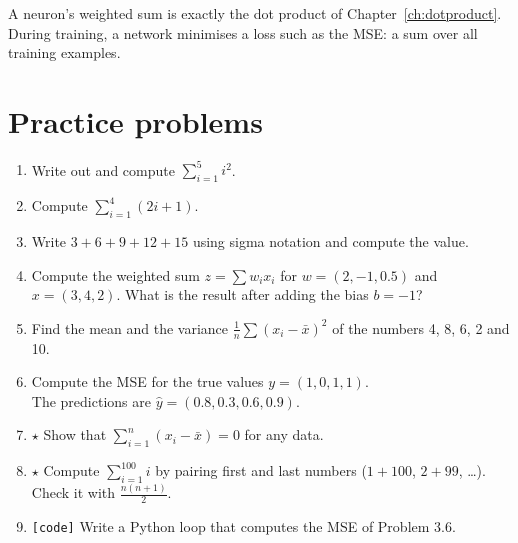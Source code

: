 \begin{center}

\label{fig:b1_9}
\end{center}

\begin{aibox}
A neuron's weighted sum is exactly the dot product of Chapter~\ref{ch:dotproduct}. During training, a network minimises a loss such as the MSE: a sum over all training examples.
\end{aibox}

\section*{Practice problems}
\begin{enumerate}[label=\textbf{\thechapter.\arabic*}]
  \item Write out and compute $\displaystyle\sum_{i=1}^5 i^2$.
  \item Compute $\displaystyle\sum_{i=1}^4(2i+1)$.
  \item Write $3+6+9+12+15$ using sigma notation and compute the value.
  \item Compute the weighted sum $z=\sum w_ix_i$ for $w=(2,-1,0.5)$ and $x=(3,4,2)$. What is the result after adding the bias $b=-1$?
  \item Find the mean and the variance $\frac1n\sum(x_i-\bar x)^2$ of the numbers 4, 8, 6, 2 and 10.
  \item Compute the MSE for the true values $y=(1,0,1,1)$.\\ The predictions are $\hat y=(0.8,0.3,0.6,0.9)$.
  \item $\star$ Show that $\displaystyle\sum_{i=1}^n(x_i-\bar x)=0$ for any data.
  \item $\star$ Compute $\displaystyle\sum_{i=1}^{100}i$ by pairing first and last numbers ($1+100$, $2+99$, \dots). Check it with $\frac{n(n+1)}{2}$.
  \item \texttt{[code]} Write a Python loop that computes the MSE of Problem 3.6.
\end{enumerate}

